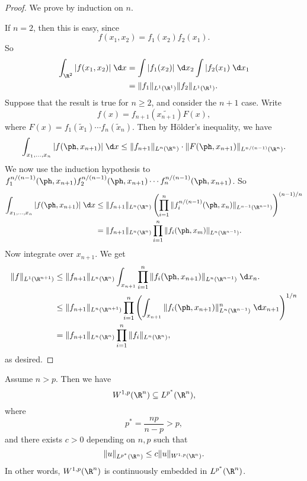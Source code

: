 \documentclass[a4paper]{article}
\begin{document}
\begin{proof}
  We prove by induction on $n$.

  If $n = 2$, then this is easy, since
  \[
    f(x_1, x_2) = f_1(x_2) f_2(x_1).
  \]
  So
  \begin{align*}
    \int_{\R^2}|f(x_1, x_2)| \;\d x &= \int |f_1(x_2)|\;\d x_2 \int |f_2(x_1)\;\d x_1\\
    &= \|f_1\|_{L^1(\R^1)} \|f_2\|_{L^1(\R^1)}.
  \end{align*}
  Suppose that the result is true for $n \geq 2$, and consider the $n + 1$ case. Write
  \[
    f(x) = f_{n + 1}(\tilde{x_{n + 1}}) F(x),
  \]
  where $F(x) = f_1(\tilde{x}_1) \cdots f_n(\tilde{x}_n)$. Then by H\"older's inequality, we have
  \[
    \int_{x_1, \ldots, x_n} |f(\ph, x_{n + 1})|\;\d x \leq \|f_{n + 1}\|_{L^n(\R^n)} \cdot \|F(\ph, x_{n + 1})\|_{L^{n/(n - 1)}(\R^n)}.
  \]
  We now use the induction hypothesis to $f_1^{n/(n - 1)} (\ph, x_{n + 1}) f_2^{n/(n - 1)}(\ph, x_{n + 1}) \cdots f_n^{n/(n - 1)}(\ph, x_{n + 1})$. So
  \begin{align*}
    \int_{x_1, \ldots, x_n} |f(\ph, x_{n + 1})|\;\d x &\leq \|f_{n + 1}\|_{L^n(\R^n)} \left(\prod_{i = 1}^n \|f_i^{n/(n-1)} (\ph, x_n)\|_{L^{n - 1}(\R^{n - 1})}\right)^{(n-1)/n}\\
    &= \|f_{n + 1}\|_{L^n(\R^n)} \prod_{i = 1}^n \|f_i(\ph, x_m)\|_{L^n(\R^{n - 1})}.
  \end{align*}
  Now integrate over $x_{n + 1}$. We get
  \begin{align*}
    \|f\|_{L^1(\R^{n + 1})} &\leq \|f_{n + 1}\|_{L^n(\R^n)} \int_{x_{n + 1}}\prod_{i = 1}^n \|f_i(\ph, x_{n + 1})\|_{L^n(\R^{n - 1})}\;\d x_n.\\
    &\leq \|f_{n + 1}\|_{L^n(\R^{n + 1})} \prod_{i = 1}^n \left(\int_{x_{n + 1}} \|f_i(\ph, x_{n + 1})\|^n_{L^n(\R^{n - 1})} \;\d x_{n + 1}\right)^{1/n}\\
    &= \|f_{n + 1}\|_{L^n(\R^n)} \prod_{i = 1}^n \|f_i\|_{L^n(\R^n)},
  \end{align*}
  as desired.
\end{proof}

\begin{thm}
  Assume $n > p$. Then we have
  \[
    W^{1, p}(\R^n) \subseteq L^{p^*}(\R^n),
  \]
  where
  \[
    p^* = \frac{np}{n - p} > p,
  \]
  and there exists $c > 0$ depending on $n, p$ such that
  \[
    \|u\|_{L^{p^*}(\R^n)} \leq c\|u\|_{W^{1, p}(\R^n)}.
  \]
  In other words, $W^{1, p}(\R^n)$ is continuously embedded in $L^{p^*}(\R^n)$.
\end{thm}
\end{document}
